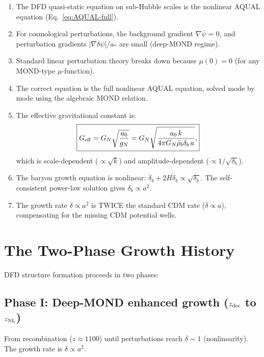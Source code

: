 \documentclass[11pt]{article}
\newcommand{\dpsi}{\delta\psi}
\newcommand{\Geff}{G_{\rm eff}}
\newcommand{\aM}{a_0}
\newcommand{\astar}{a_*}
\begin{document}
\begin{enumerate}
\item The DFD quasi-static equation on sub-Hubble scales is the
  nonlinear AQUAL equation (Eq.~\ref{eq:AQUAL-full}).

\item For cosmological perturbations, the background gradient
  $\nabla\bar\psi = 0$, and perturbation gradients
  $|\nabla\dpsi|/\astar$ are small (deep-MOND regime).

\item Standard linear perturbation theory breaks down because
  $\mu(0) = 0$ (for any MOND-type $\mu$-function).

\item The correct equation is the full nonlinear AQUAL equation,
  solved mode by mode using the algebraic MOND relation.

\item The effective gravitational constant is:
  \begin{equation}
  \boxed{
  \Geff = G_N\sqrt{\frac{\aM}{g_N}} = G_N\sqrt{\frac{\aM\,k}
  {4\pi G_N\bar\rho_b\delta_b\,a}},
  }
  \end{equation}
  which is scale-dependent ($\propto\sqrt{k}$) and
  amplitude-dependent ($\propto 1/\sqrt{\delta_b}$).

\item The baryon growth equation is nonlinear:
  $\ddot\delta_b + 2H\dot\delta_b \propto \sqrt{\delta_b}$.
  The self-consistent power-law solution gives $\delta_b \propto a^2$.

\item The growth rate $\delta \propto a^2$ is TWICE the standard
  CDM rate ($\delta \propto a$), compensating for the missing CDM
  potential wells.
\end{enumerate}

\section{The Two-Phase Growth History}

DFD structure formation proceeds in two phases:

\subsection{Phase I: Deep-MOND enhanced growth ($z_{\rm dec}$ to $z_{\rm NL}$)}

From recombination ($z \approx 1100$) until perturbations reach
$\delta \sim 1$ (nonlinearity). The growth rate is $\delta \propto a^2$.
\end{document}
